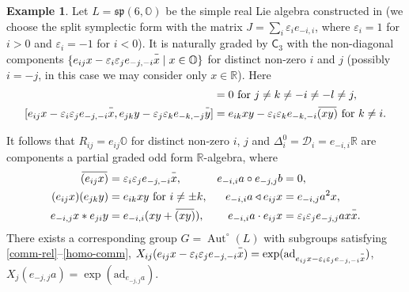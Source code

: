 \documentclass{article}
\theoremstyle{definition}
\newtheorem{example}{Example}
\newcommand{\eps}{\varepsilon}
\newcommand{\inv}[1]{
    \!\;\overline{
        \!\!\:#1\vphantom !\!\!\:
    }\;\!
}
\DeclareMathOperator{\Aut}{Aut}
\begin{document}
\begin{example}
    Let \(
        L = \mathfrak{sp}(6, \mathbb O)
    \) be the simple real Lie algebra constructed in \cite[theorem 5.1]{magic-square} (we choose the split symplectic form with the matrix \(
        J = \sum_i \eps_i e_{-i, i}
    \), where \(
        \eps_i = 1
    \) for \(i > 0\) and \(
        \eps_i = -1
    \) for \(i < 0\)). It is naturally graded by \(\mathsf C_3\) with the non-diagonal components \(
        \{
            e_{ij} x - \eps_i \eps_j e_{-j, -i} \inv x
            \mid
            x \in \mathbb O
        \}
    \) for distinct non-zero \(i\) and \(j\) (possibly \(i = -j\), in this case we may consider only \(x \in \mathbb R\)). Here
    \begin{align*}
        [
            e_{ij} x
            - \eps_i \eps_j e_{-j, -i} \inv x,
            e_{kl} y
            - \eps_k \eps_l e_{-l, -k} \inv y
        ]
        &= 0
        \text{ for } j \neq k \neq -i \neq -l \neq j,
        \\
        [
            e_{ij} x
            - \eps_i \eps_j e_{-j, -i} \inv x,
            e_{jk} y
            - \eps_j \eps_k e_{-k, -j} \inv y
        ]
        &=
        e_{ik} xy
        - \eps_i \eps_k e_{-k, -i} \inv{(xy)}
        \text{ for } k \neq i.
    \end{align*}

    It follows that \(
        R_{ij} = e_{ij} \mathbb O
    \) for distinct non-zero \(i\), \(j\) and \(
        \Delta^0_i
        =
        \mathcal D_i
        =
        e_{-i, i} \mathbb R
    \) are components a partial graded odd form \(\mathbb R\)-algebra, where
    \begin{align*}
        \inv{(e_{ij} x)}
        &=
        \eps_i \eps_j e_{-j, -i} \inv x,
        &
        e_{-i, i} a \circ e_{-j, j} b &= 0,
        \\
        (e_{ij} x) (e_{jk} y) &= e_{ik} xy
        \text{ for } i \neq \pm k,
        &
        e_{-i, i} a \triangleleft e_{ij} x
        &=
        e_{-i, j} a^2 x,
        \\
        e_{-i, j} x * e_{ji} y
        &=
        e_{-i, i} (xy + \inv{(xy)}),
        &
        e_{-i, i} a \cdot e_{ij} x
        &=
        \eps_i \eps_j e_{-j, j} a x \inv x.
    \end{align*}
    There exists a corresponding group \(
        G = \Aut^\circ(L)
    \) with subgroups satisfying \ref{comm-rel}--\ref{homo-comm}, \(
        X_{ij}(
            e_{ij} x - \eps_i \eps_j e_{-j, -i} \inv x
        )
        =
        \exp(\mathrm{ad}_{
            e_{ij} x - \eps_i \eps_j e_{-j, -i} \inv x
        })
    \), \(
        X_j(e_{-j, j} a)
        =
        \exp(\mathrm{ad}_{e_{-j, j} a})
    \).
\end{example}
\end{document}
